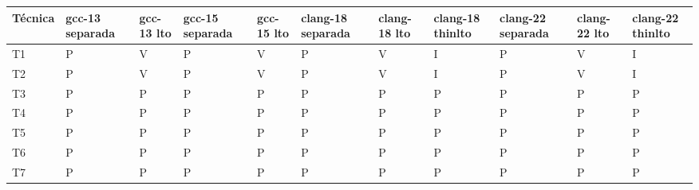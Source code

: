 \begin{tabular}{@{}lllllllllll@{}}
\toprule
Técnica & gcc-13 separada & gcc-13 lto & gcc-15 separada & gcc-15 lto & clang-18 separada & clang-18 lto & clang-18 thinlto & clang-22 separada & clang-22 lto & clang-22 thinlto \\
\midrule
T1 & P & V & P & V & P & V & I & P & V & I \\
T2 & P & V & P & V & P & V & I & P & V & I \\
T3 & P & P & P & P & P & P & P & P & P & P \\
T4 & P & P & P & P & P & P & P & P & P & P \\
T5 & P & P & P & P & P & P & P & P & P & P \\
T6 & P & P & P & P & P & P & P & P & P & P \\
T7 & P & P & P & P & P & P & P & P & P & P \\
\bottomrule
\end{tabular}
